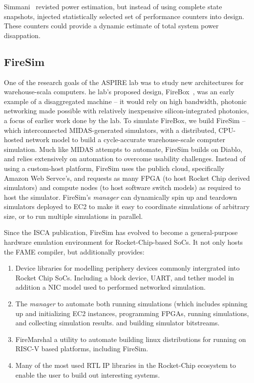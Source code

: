 Simmani~\cite{Simanni} revisted power estimation, but instead of using complete
state snapshots, injected statistically selected set of performance counters
into design. These counters could provide a dynamic estimate of total system
power disappation.

\subsection{FireSim}

One of the research goals of the ASPIRE lab was to study new architectures for
warehouse-scala computers.  he lab's proposed design, FireBox~\cite{FireBox},
was an early example of a disaggregated machine -- it would rely on high
bandwidth, photonic networking made possible with relatively inexpensive
silicon-integrated photonics, a focus of earlier work done by the lab.  To
simulate FireBox, we build FireSim -- which interconnected MIDAS-generated
simulators, with a distributed, CPU-hosted network model to build a
cycle-accurate warehouse-scale computer simulation. Much like MIDAS attempts to
automate, FireSim builds on Diablo, and relies extensively on automation to overcome usability challenges.
Instead of using a custom-host platform, FireSim uses the publich cloud, specifically Amazon Web Servce's, and requests as many FPGA (to host Rocket
Chip derived simulators) and compute nodes (to host software switch models) as
required to host the simulator. FireSim's \emph{manager} can dynamically spin
up and teardown simulators deployed to EC2 to make it easy to coordinate
simulations of arbitrary size, or to run multiple simulations in parallel.

Since the ISCA publication, FireSim has evolved to become a general-purpose hardware emulation environment
for Rocket-Chip-based SoCs. It not only hosts the FAME compiler, but additionally provides:
\begin{enumerate}
    \item Device libraries for modelling periphery devices commonly intergrated into Rocket Chip SoCs. Including a block device, UART,
        and tether model in addition a NIC model used to performed networked simulation.
    \item The \emph{manager} to automate both running simulations (which includes spinning up and initializing EC2 instances, programming FPGAs, running simulations, and collecting
        simulation results. and building simulator bitstreams.
    \item FireMarshal a utility to automate building linux distributions for
        running on RISC-V based platforms, including FireSim.
    \item Many of the most used RTL IP libraries in the Rocket-Chip ecosystem to enable the user to build out interesting systems.
\end{enumerate}


